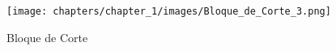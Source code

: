 \begin{enumerate}
\begin{itemize}
\begin{figure}[H]
\begin{center}
     \texttt{[image: chapters/chapter\_1/images/Bloque\_de\_Corte\_3.png]}
\end{center}
\caption{Bloque de Corte}
\end{figure}

\end{itemize}
\end{enumerate}